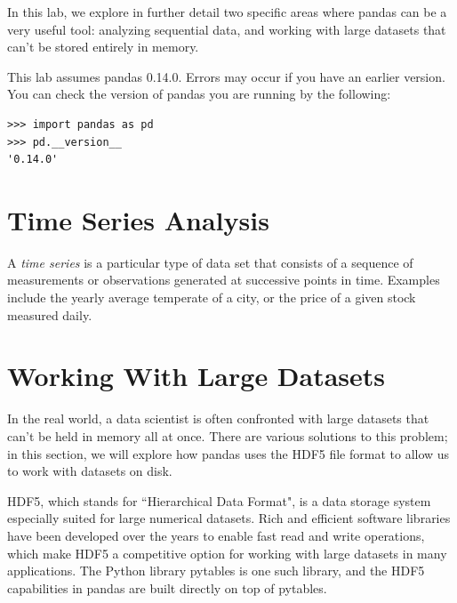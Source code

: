 
In this lab, we explore in further detail two specific areas where pandas can be a very useful tool:
analyzing sequential data, and working with large datasets that can't be stored entirely in memory.
\begin{warn}
This lab assumes pandas 0.14.0. Errors may occur if you have an earlier version.
You can check the version of pandas you are running by the following:
\begin{lstlisting}
>>> import pandas as pd
>>> pd.__version__
'0.14.0'
\end{lstlisting}
\end{warn}
\section*{Time Series Analysis}
A \emph{time series} is a particular type of data set that consists of a sequence of measurements or observations
generated at successive points in time. Examples include the yearly average temperate of a city, or
the price of a given stock measured daily.

\section*{Working With Large Datasets}
In the real world, a data scientist is often confronted with large datasets that can't be held in memory all at once.
There are various solutions to this problem; in this section, we will explore how pandas uses the HDF5 file format
to allow us to work with datasets on disk.

HDF5, which stands for ``Hierarchical Data Format", is a data storage system especially suited for large numerical datasets.
Rich and efficient software libraries have been developed over the years to enable fast read and write operations,
which make HDF5 a competitive option for working with large datasets in many applications. The Python library pytables
is one such library, and the HDF5 capabilities in pandas are built directly on top of pytables.

